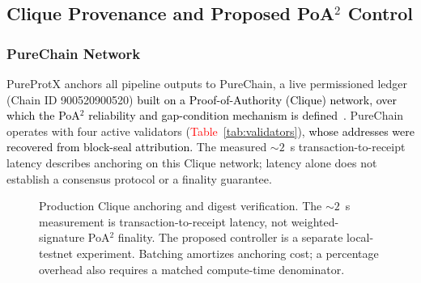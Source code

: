 \documentclass[conference]{IEEEtran}
\newcommand{\rev}[2]{#2}
\begin{document}
\subsection{\textbf{\rev{R1.2, R2.4}{Clique Provenance and Proposed PoA$^2$ Control}}}
\label{sec:blockchain}

\subsubsection{PureChain Network}

PureProtX anchors all pipeline outputs to PureChain, a
live permissioned ledger (Chain ID 900520900520)
\textcolor{black}{built on a Proof-of-Authority (Clique) network, over
which the PoA$^2$ reliability and gap-condition mechanism is
defined~\cite{kim2025proof, ajakwe2025ebctc}.}
PureChain operates with four active validators (\textcolor{red}{Table~\ref{tab:validators}}),
\textcolor{black}{whose addresses were recovered from block-seal
attribution.} \rev{R2.4}{The measured ${\sim}2$~s transaction-to-receipt
latency describes anchoring on this Clique network; latency alone
does not establish a consensus protocol or a finality guarantee.}

\begin{figure}[!t]
\centering
{}
\caption{\rev{R1.1, R1.2, R1.3, R1.4, R2.2, R2.4}{Production
Clique anchoring and digest verification. The ${\sim}2$~s
measurement is transaction-to-receipt latency, not weighted-signature
PoA$^2$ finality. The proposed controller is a separate local-testnet
experiment. Batching amortizes anchoring cost; a percentage overhead
also requires a matched compute-time denominator.}}

\label{fig:poa-provenance}
\end{figure}
\end{document}

